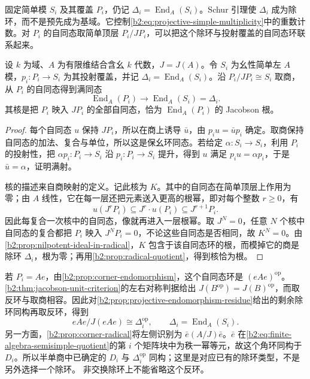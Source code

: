 固定简单模 \(S_i\) 及其覆盖 \(P_i\)，仍记 \(\Delta_i=\operatorname{End}_A(S_i)\)。Schur 引理使 \(\Delta_i\) 成为除环，而不是预先成为基域。它控制\eqref{b2:eq:projective-simple-multiplicity}中的重数计数。对 \(P_i\) 的自同态取简单顶层 \(P_i/JP_i\)，可以把这个除环与投射覆盖的自同态环联系起来。

\begin{proposition}\label{b2:prop:projective-endomorphism-residue}
	设 \(k\) 为域、\(A\) 为有限维结合含幺 \(k\) 代数，\(J=J(A)\)。令 \(S_i\) 为幺性简单左 \(A\) 模，\(p_i:P_i\to S_i\) 为其投射覆盖，并记 \(\Delta_i=\operatorname{End}_A(S_i)\)。沿 \(P_i/JP_i\cong S_i\) 取商，从 \(P_i\) 的自同态得到满同态
	\[
		\operatorname{End}_A(P_i)\longrightarrow\operatorname{End}_A(S_i)=\Delta_i.
	\]
	其核是把 \(P_i\) 映入 \(JP_i\) 的全部自同态，恰为 \(\operatorname{End}_A(P_i)\) 的 Jacobson 根。
\end{proposition}
\begin{proof}
	每个自同态 \(u\) 保持 \(JP_i\)，所以在商上诱导 \(\bar u\)，由 \(p_i u=\bar u p_i\) 确定。取商保持自同态的加法、复合与单位，所以这是保幺环同态。若给定 \(\alpha:S_i\to S_i\)，利用 \(P_i\) 的投射性，把 \(\alpha p_i:P_i\to S_i\) 沿 \(p_i:P_i\to S_i\) 提升，得到 \(u\) 满足 \(p_i u=\alpha p_i\)，于是 \(\bar u=\alpha\)，证明满射。

	核的描述来自商映射的定义。记此核为 \(K\)。其中的自同态在简单顶层上作用为零；由 \(A\) 线性，它在每一层还把元素送入更高的根幂，即对每个整数 \(r\ge0\)，有
	\[
		u(J^rP_i)\subseteq J^r\cdot u(P_i)\subseteq J^{r+1}P_i.
	\]
	因此每复合一次核中的自同态，像就再进入一层根幂。取 \(J^N=0\)，任意 \(N\) 个核中自同态的复合都把 \(P_i\) 映入 \(J^NP_i=0\)，不论这些自同态是否相同，故 \(K^N=0\)。由\cref{b2:prop:nilpotent-ideal-in-radical}，\(K\) 包含于该自同态环的根，而模掉它的商是除环 \(\Delta_i\)，根为零；再用\cref{b2:prop:radical-quotient}，得到核恰为根。
\end{proof}

若 \(P_i=Ae\)，由\cref{b2:prop:corner-endomorphism}，这个自同态环是 \((eAe)^{\mathrm{op}}\)。\cref{b2:thm:jacobson-unit-criterion}的左右对称判据给出 \(J(B^{\mathrm{op}})=J(B)^{\mathrm{op}}\)，而取反环与取商相容。因此对\cref{b2:prop:projective-endomorphism-residue}给出的剩余除环同构再取反环，得到
\[
	eAe/J(eAe)\cong\Delta_i^{\mathrm{op}},\qquad \Delta_i=\operatorname{End}_A(S_i).
\]
另一方面，\cref{b2:prop:corner-radical}将左侧识别为 \(\bar e(A/J)\bar e\)。\(\bar e\) 在\eqref{b2:eq:finite-algebra-semisimple-quotient}的第 \(i\) 个矩阵块中为秩一幂等元，故这个角环同构于 \(D_i\)。所以半单商中已确定的 \(D_i\) 与 \(\Delta_i^{\mathrm{op}}\) 同构；这里是对应已有的除环类型，不是另外选择一个除环。 非交换除环上不能省略这个反环。

